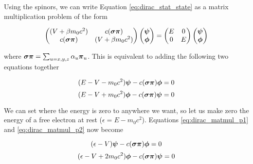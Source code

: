 Using the spinors, we can write Equation \ref{eq:dirac_stat_state} as a matrix multiplication problem of the form

\begin{equation}
\label{eq:dirac_stat_state_matmul}
\begin{pmatrix}
(V + \beta m_{0}c^{2})	&	c({\bf{\sigma\pi}})		\\
c({\bf{\sigma\pi}})		&	(V + \beta m_{0}c^{2})	\\
\end{pmatrix}
\begin{pmatrix}
{\bf{\psi}}	\\
{\bf{\phi}}	\\
\end{pmatrix}
=
\begin{pmatrix}
E	&	0	\\
0	&	E	\\
\end{pmatrix}
\begin{pmatrix}
{\bf{\psi}}	\\
{\bf{\phi}}	\\
\end{pmatrix}
\end{equation}

where ${\bf{\sigma\pi}} =\sum_{u=x,y,z}\alpha_{u}{\bf{\pi}}_{u}$. This is equivalent to adding the following two equations together

\begin{equation}
\label{eq:dirac_matmul_p1}
(E - V - m_{0}c^{2}){\bf{\psi}} - c({\bf{\sigma\pi}}){\bf{\phi}} = 0
\end{equation}
\begin{equation}
\label{eq:dirac_matmul_p2}
(E - V + m_{0}c^{2}){\bf{\phi}} - c({\bf{\sigma\pi}}){\bf{\psi}} = 0
\end{equation}

We can set where the energy is zero to anywhere we want, so let us make zero the energy of a free electron at rest ($\epsilon = E - m_{0}c^{2}$). Equations \ref{eq:dirac_matmul_p1} and \ref{eq:dirac_matmul_p2} now become

\begin{equation}
\label{eq:dirac_matmul_p3}
(\epsilon - V){\bf{\psi}} - c({\bf{\sigma\pi}}){\bf{\phi}} = 0
\end{equation}
\begin{equation}
\label{eq:dirac_matmul_p4}
(\epsilon - V + 2m_{0}c^{2}){\bf{\phi}} - c({\bf{\sigma\pi}}){\bf{\psi}} = 0
\end{equation}

